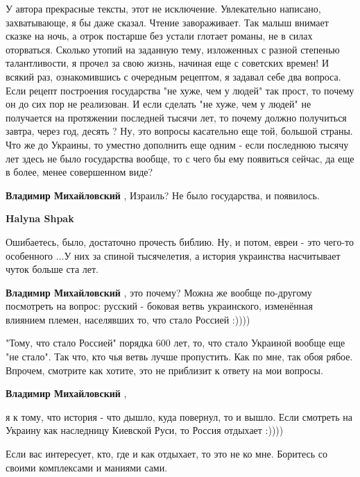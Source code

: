 \begin{itemize}
У автора прекрасные тексты, этот не исключение. Увлекательно
написано, захватывающе, я бы даже сказал. Чтение завораживает. Так малыш внимает
сказке на ночь, а отрок постарше без устали глотает романы, не в силах
оторваться. Сколько утопий на заданную тему, изложенных с разной степенью
талантливости, я прочел за свою жизнь, начиная еще с советских времен! И всякий
раз, ознакомившись с очередным рецептом, я задавал себе два вопроса. Если рецепт
построения государства "не хуже, чем у людей" так прост, то почему он до сих пор
не реализован. И если сделать "не хуже, чем у людей" не получается на
протяжении последней тысячи лет, то почему должно получиться завтра, через
год, десять ? Ну, это вопросы касательно еще той, большой страны. Что же до
Украины, то уместно дополнить еще одним - если последнюю тысячу лет здесь не
было государства вообще, то с чего бы ему появиться сейчас, да еще в более, менее
совершенном виде?

\begin{itemize} %
\textbf{Владимир Михайловский} , Израиль? Не было государства, и появилось.

\textbf{Halyna Shpak} 

Ошибаетесь, было, достаточно прочесть библию. Ну, и потом, евреи - это чего-то
особенного ...У них за спиной тысячелетия, а история украинства насчитывает
чуток больше ста лет.

\textbf{Владимир Михайловский} , это почему? Можна же вообще по-другому посмотреть на вопрос: русский - боковая ветвь украинского, изменённая влиянием племен, населявших то, что стало Россией :))))


"Тому, что стало Россией" порядка 600 лет, то, что стало Украиной вообще еще "не
стало". Так что, кто чья ветвь лучше пропустить. Как по мне, так обоя
рябое. Впрочем, смотрите как хотите, это не приблизит к ответу на мои вопросы.


\textbf{Владимир Михайловский} , 

я к тому, что история - что дышло, куда повернул, то и вышло. Если смотреть на
Украину как наследницу Киевской Руси, то Россия отдыхает :))))


Если вас интересует, кто, где и как отдыхает, то это не ко мне. Боритесь со своими комплексами и маниями сами.
\end{itemize} %


\end{itemize}
